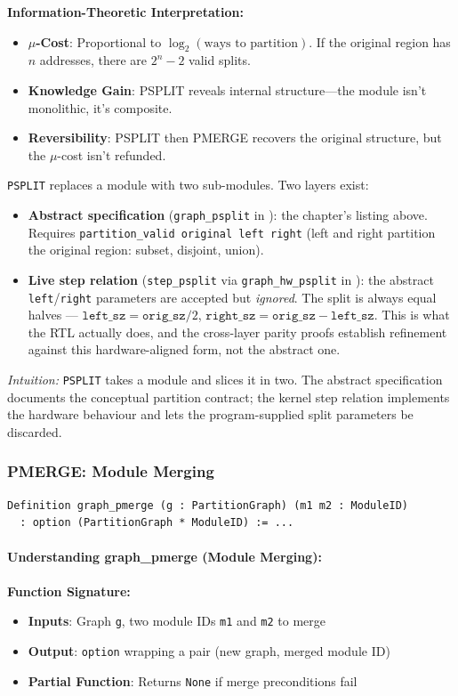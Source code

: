 \textbf{Information-Theoretic Interpretation:}
\begin{itemize}
    \item \textbf{$\mu$-Cost}: Proportional to $\log_2(\text{ways to partition})$. If the original region has $n$ addresses, there are $2^n - 2$ valid splits.
    \item \textbf{Knowledge Gain}: PSPLIT reveals internal structure---the module isn't monolithic, it's composite.
    \item \textbf{Reversibility}: PSPLIT then PMERGE recovers the original structure, but the $\mu$-cost isn't refunded.
\end{itemize}

\texttt{PSPLIT} replaces a module with two sub-modules. Two layers exist:
\begin{itemize}
    \item \textbf{Abstract specification} (\texttt{graph\_psplit} in ): the chapter's listing above. Requires \texttt{partition\_valid original left right} (left and right partition the original region: subset, disjoint, union).
    \item \textbf{Live step relation} (\texttt{step\_psplit} via \texttt{graph\_hw\_psplit} in ): the abstract \texttt{left}/\texttt{right} parameters are accepted but \emph{ignored}. The split is always equal halves --- $\texttt{left\_sz} = \texttt{orig\_sz}/2$, $\texttt{right\_sz} = \texttt{orig\_sz} - \texttt{left\_sz}$. This is what the RTL actually does, and the cross-layer parity proofs establish refinement against this hardware-aligned form, not the abstract one.
\end{itemize}

\textit{Intuition:} \texttt{PSPLIT} takes a module and slices it in two. The abstract specification documents the conceptual partition contract; the kernel step relation implements the hardware behaviour and lets the program-supplied split parameters be discarded.

\subsubsection{PMERGE: Module Merging}

\begin{lstlisting}
Definition graph_pmerge (g : PartitionGraph) (m1 m2 : ModuleID)
  : option (PartitionGraph * ModuleID) := ...
\end{lstlisting}

\paragraph{Understanding graph\_pmerge (Module Merging):}
\textbf{Function Signature:}
\begin{itemize}
    \item \textbf{Inputs}: Graph \texttt{g}, two module IDs \texttt{m1} and \texttt{m2} to merge
    \item \textbf{Output}: \texttt{option} wrapping a pair (new graph, merged module ID)
    \item \textbf{Partial Function}: Returns \texttt{None} if merge preconditions fail
\end{itemize}

